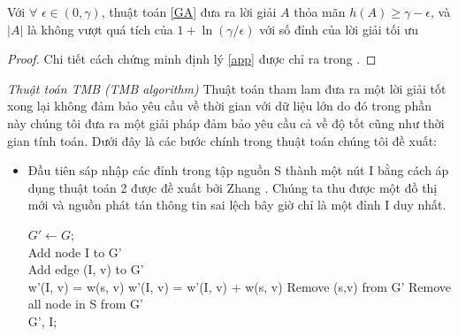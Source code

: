 \begin{theo} Với $\forall$ $\epsilon \in (0, \gamma)$, thuật toán \ref{GA} đưa ra lời giải $A$ thỏa mãn $h(A) \geq \gamma- \epsilon$, và $|A|$ là không vượt quá tích của $1+\ln(\gamma/ \epsilon)$ với số đỉnh của lời giải tối ưu \label{app}
\end{theo}		
\begin{proof}
	Chi tiết cách chứng minh định lý \ref{app} được chỉ ra trong \cite{snam}. 
\end{proof}
{\itshape Thuật toán TMB (TMB algorithm)}
Thuật toán tham lam đưa ra một lời giải tốt xong lại không đảm bảo yêu cầu về thời gian với dữ liệu lớn do đó trong phần này chúng tôi đưa ra một giải pháp đảm bảo yêu cầu cả về độ tốt cũng như thời gian tính toán. Dưới đây là các bước chính trong thuật toán chúng tôi đề xuất:
\begin {itemize}
\item Đầu tiên sáp nhập các đỉnh trong tập nguồn S thành một nút I bằng cách áp dụng thuật toán 2 được đề xuất bởi Zhang \cite{zhang39}. Chúng ta thu được một đồ thị mới và nguồn phát tán thông tin sai lệch bây giờ chỉ là một đỉnh I duy nhất.

\begin{algorithm}[tbh]			
	$G' \leftarrow G$;
	\\
	Add node I to G'			
	\\
	{
		{
			{
				Add edge (I, v) to G'
				\\
				w'(I, v) = w(s, v)
			}
			{
				w'(I, v) = w'(I, v) + w(s, v)
			}
			Remove (s,v) from G'
		}
	}
	Remove all node in S from G'
	\\
	\Return G', I;
	\caption{MERGE Algorithm(MERGE)}
	\label{MERGE}
\end{algorithm}		


\end{itemize}
